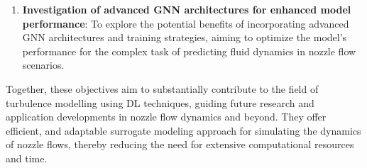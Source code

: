 \begin{enumerate}
\item \textbf{Investigation of advanced GNN architectures for enhanced model performance}: To explore the potential benefits of incorporating advanced GNN architectures and training strategies, aiming to optimize the model's performance for the complex task of predicting fluid dynamics in nozzle flow scenarios.
\end{enumerate}
Together, these objectives aim to substantially contribute to the field of turbulence modelling using DL techniques, guiding future research and application developments in nozzle flow dynamics and beyond. They offer efficient, and adaptable surrogate modeling approach for simulating the dynamics of nozzle flows, thereby reducing the need for extensive computational resources and time.